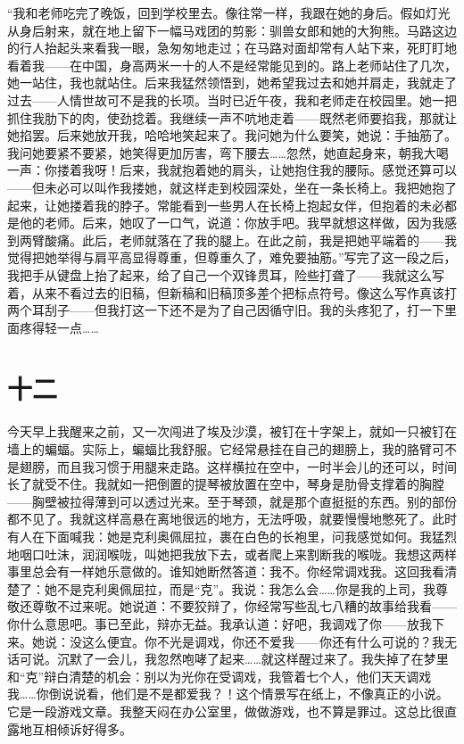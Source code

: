 “我和老师吃完了晚饭，回到学校里去。像往常一样，我跟在她的身后。假如灯光从身后射来，就在地上留下一幅马戏团的剪影：驯兽女郎和她的大狗熊。马路这边的行人抬起头来看我一眼，急匆匆地走过；在马路对面却常有人站下来，死盯盯地看着我——在中国，身高两米一十的人不是经常能见到的。路上老师站住了几次，她一站住，我也就站住。后来我猛然领悟到，她希望我过去和她并肩走，我就走了过去——人情世故可不是我的长项。当时已近午夜，我和老师走在校园里。她一把抓住我肋下的肉，使劲捻着。我继续一声不吭地走着——既然老师要掐我，那就让她掐罢。后来她放开我，哈哈地笑起来了。我问她为什么要笑，她说：手抽筋了。我问她要紧不要紧，她笑得更加厉害，弯下腰去……忽然，她直起身来，朝我大喝一声：你搂着我呀！后来，我就抱着她的肩头，让她抱住我的腰际。感觉还算可以——但未必可以叫作我搂她，就这样走到校园深处，坐在一条长椅上。我把她抱了起来，让她搂着我的脖子。常能看到一些男人在长椅上抱起女伴，但抱着的未必都是他的老师。后来，她叹了一口气，说道：你放手吧。我早就想这样做，因为我感到两臂酸痛。此后，老师就落在了我的腿上。在此之前，我是把她平端着的——我觉得把她举得与肩平高显得尊重，但尊重久了，难免要抽筋。”写完了这一段之后，我把手从键盘上抬了起来，给了自己一个双锋贯耳，险些打聋了——我就这么写着，从来不看过去的旧稿，但新稿和旧稿顶多差个把标点符号。像这么写作真该打两个耳刮子——但我打这一下还不是为了自己因循守旧。我的头疼犯了，打一下里面疼得轻一点…… 
\section*{十二} 

今天早上我醒来之前，又一次闯进了埃及沙漠，被钉在十字架上，就如一只被钉在墙上的蝙蝠。实际上，蝙蝠比我舒服。它经常悬挂在自己的翅膀上，我的胳臂可不是翅膀，而且我习惯于用腿来走路。这样横拉在空中，一时半会儿的还可以，时间长了就受不住。我就如一把倒置的提琴被放置在空中，琴身是肋骨支撑着的胸膛——胸壁被拉得薄到可以透过光来。至于琴颈，就是那个直挺挺的东西。别的部份都不见了。我就这样高悬在离地很远的地方，无法呼吸，就要慢慢地憋死了。此时有人在下面喊我：她是克利奥佩屈拉，裹在白色的长袍里，问我感觉如何。我猛烈地咽口吐沫，润润喉咙，叫她把我放下去，或者爬上来割断我的喉咙。我想这两样事里总会有一样她乐意做的。谁知她断然答道：我不。你经常调戏我。这回我看清楚了：她不是克利奥佩屈拉，而是“克”。我说：我怎么会……你是我的上司，我尊敬还尊敬不过来呢。她说道：不要狡辩了，你经常写些乱七八糟的故事给我看——你什么意思吧。事已至此，辩亦无益。我承认道：好吧，我调戏了你——放我下来。她说：没这么便宜。你不光是调戏，你还不爱我——你还有什么可说的？我无话可说。沉默了一会儿，我忽然咆哮了起来……就这样醒过来了。我失掉了在梦里和“克”辩白清楚的机会：别以为光你在受调戏，我管着七个人，他们天天调戏我……你倒说说看，他们是不是都爱我？！这个情景写在纸上，不像真正的小说。它是一段游戏文章。我整天闷在办公室里，做做游戏，也不算是罪过。这总比很直露地互相倾诉好得多。 

